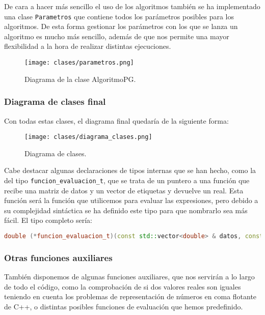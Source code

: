 De cara a hacer más sencillo el uso de los algoritmos también se ha implementado una clase \texttt{Parametros} que contiene todos los parámetros posibles para los algoritmos. De esta forma gestionar los parámetros con los que se lanza un algoritmo es mucho más sencillo, además de que nos permite una mayor flexibilidad a la hora de realizar distintas ejecuciones.

\begin{figure}[H]
	 \centering
	 \texttt{[image: clases/parametros.png]}
	 \caption{Diagrama de la clase AlgoritmoPG.}
	\label{fig:diagrama_clase_parametros}
\end{figure}


\subsubsection{Diagrama de clases final}

Con todas estas clases, el diagrama final quedaría de la siguiente forma:

\begin{figure}[H]
	 \centering
	 \texttt{[image: clases/diagrama\_clases.png]}
	 \caption{Diagrama de clases.}
	\label{fig:diagrama_clases}
\end{figure}

Cabe destacar algunas declaraciones de tipos internas que se han hecho, como la del tipo \texttt{funcion\_evaluacion\_t}, que se trata de un puntero a una función que recibe una matriz de datos y un vector de etiquetas y devuelve un real. Esta función será la función que utilicemos para evaluar las expresiones, pero debido a su complejidad sintáctica se ha definido este tipo para que nombrarlo sea más fácil. El tipo completo sería:

\begin{lstlisting}[language=C++]
double (*funcion_evaluacion_t)(const std::vector<double> & datos, const std::vector<double> & etiquetas)
\end{lstlisting}

\subsubsection{Otras funciones auxiliares}

También disponemos de algunas funciones auxiliares, que nos servirán a lo largo de todo el código, como la comprobación de si dos valores reales son iguales teniendo en cuenta los problemas de representación de números en coma flotante de C++, o distintas posibles funciones de evaluación que hemos predefinido.

